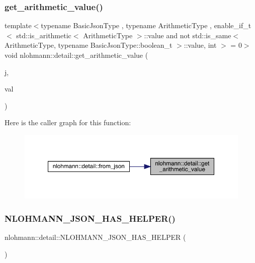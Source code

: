 \mbox{\label{namespacenlohmann_1_1detail_a85955b9c6dd31846e4b8e891f78614b6}} 
\subsubsection{\texorpdfstring{get\_arithmetic\_value()}{get\_arithmetic\_value()}}
{\footnotesize\ttfamily template$<$typename Basic\+Json\+Type , typename Arithmetic\+Type , enable\+\_\+if\+\_\+t$<$ std\+::is\+\_\+arithmetic$<$ Arithmetic\+Type $>$\+::value and not std\+::is\+\_\+same$<$ Arithmetic\+Type, typename Basic\+Json\+Type\+::boolean\+\_\+t $>$\+::value, int $>$  = 0$>$ \\
void nlohmann\+::detail\+::get\+\_\+arithmetic\+\_\+value (\begin{DoxyParamCaption}\item[{const Basic\+Json\+Type \&}]{j,  }\item[{Arithmetic\+Type \&}]{val }\end{DoxyParamCaption})}

Here is the caller graph for this function\+:\nopagebreak
\begin{figure}[H]
\begin{center}
\leavevmode
\includegraphics[width=350pt]{namespacenlohmann_1_1detail_a85955b9c6dd31846e4b8e891f78614b6_icgraph}
\end{center}
\end{figure}
\mbox{\label{namespacenlohmann_1_1detail_a7b2601c238073c43a07862768b319cf8}} 
\subsubsection{\texorpdfstring{NLOHMANN\_JSON\_HAS\_HELPER()}{NLOHMANN\_JSON\_HAS\_HELPER()}\hspace{0.1cm}{\footnotesize\ttfamily [1/4]}}
{\footnotesize\ttfamily nlohmann\+::detail\+::\+N\+L\+O\+H\+M\+A\+N\+N\+\_\+\+J\+S\+O\+N\+\_\+\+H\+A\+S\+\_\+\+H\+E\+L\+P\+ER (\begin{DoxyParamCaption}\item[{mapped\+\_\+type}]{ }\end{DoxyParamCaption})}

